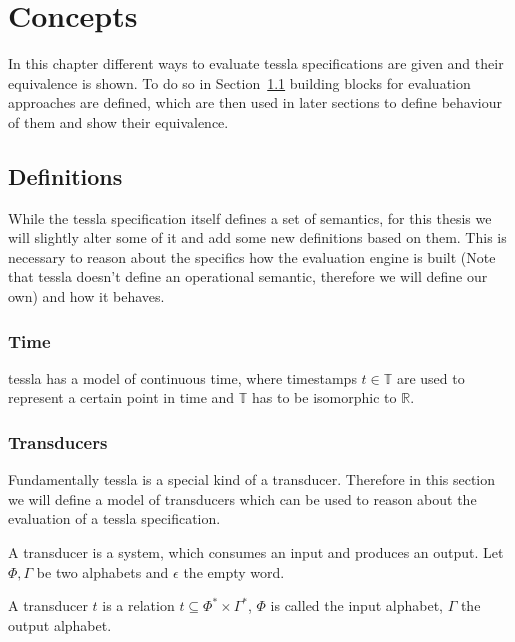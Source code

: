 \chapter{Concepts}
\label{sec:concepts}

In this chapter different ways to evaluate \gls{tessla} specifications are given and their equivalence is shown.
To do so in Section~\ref{sec:concepts:defs} building blocks for evaluation approaches are defined, which are then used in later sections to define behaviour of them and show their equivalence.

\section{Definitions}
\label{sec:concepts:defs}

While the \gls{tessla} specification itself defines a set of semantics, for this thesis we will slightly alter some of it and add some new definitions based on them.
This is necessary to reason about the specifics how the evaluation engine is built (Note that \gls{tessla} doesn't define an operational semantic, therefore we will define our own) and how it behaves.

\subsection{Time}
\label{sec:concepts:defs:time}

\gls{tessla} has a model of continuous time, where timestamps \(t \in \mathbb{T} \) are used to represent a certain point in time and \(\mathbb{T}\) has to be isomorphic to \(\mathbb{R}\).

\subsection{Transducers}
\label{sec:concepts:defs:transducers}

Fundamentally \gls{tessla} is a special kind of a transducer.
Therefore in this section we will define a model of transducers which can be used to reason about the evaluation of a \gls{tessla} specification.

A transducer is a system, which consumes an input and produces an output.
Let \(\Phi, \Gamma\) be two alphabets and \(\epsilon\) the empty word.

\begin{definition}[name = Transducer]\label{def:transducer}
  A transducer \(t\) is a relation \(t \subseteq \Phi^* \times \Gamma^*\), \(\Phi\) is called the input alphabet, \(\Gamma\) the output alphabet.
\end{definition}

